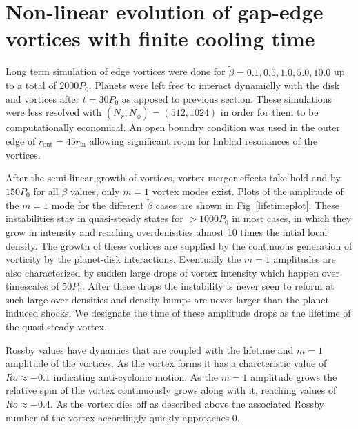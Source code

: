 \section{Non-linear evolution of
  gap-edge vortices with finite cooling time} 

Long term simulation of edge vortices were done for $\tilde{\beta}=0.1,0.5,1.0,5.0,10.0$ up to a total of $2000P_0$. Planets were left free to interact dynamiclly with the disk and vortices after $t=30P_0$ as apposed to previous section. These simulations were less resolved with $(N_r,N_{\phi})=(512,1024)$ in order for them to be computationally economical. An open boundry condition was used in the outer edge of $r_{\mathrm{out}}=45r_{\mathrm{in}}$ allowing significant room for linblad resonances of the vortices.

After the semi-linear growth of vortices, vortex merger effects take hold and by $150P_0$ for all $\tilde\beta$ values, only $m=1$ vortex modes exist. Plots of the amplitude of the $m=1$ mode for the different $\tilde\beta$ cases are shown in Fig~\ref{lifetimeplot}. These instabilities stay in quasi-steady states for $>1000P_0$ in most cases, in which they grow in intensity and reaching overdenisities almost 10 times the intial local density. The growth of these vortices are supplied by the continuous generation of vorticity by the planet-disk interactions. Eventually the $m=1$ amplitudes are also characterized by sudden large drops of vortex intensity which happen over timescales of $50P_0$. After these drops the instability is never seen to reform at such large over densities and density bumps are never larger than the planet induced shocks. We designate the time of these amplitude drops as the lifetime of the quasi-steady vortex. 

Rossby values have dynamics that are coupled with the lifetime and $m=1$ amplitude of the vortices. As the vortex forms it has a charcteristic value of $Ro\approx-0.1$ indicating anti-cyclonic motion. As the $m=1$ amplitude grows the relative spin of the vortex continuously grows along with it, reaching values of $Ro\approx-0.4$. As the vortex dies off as described above the associated Rossby number of the vortex accordingly quickly approaches 0.

